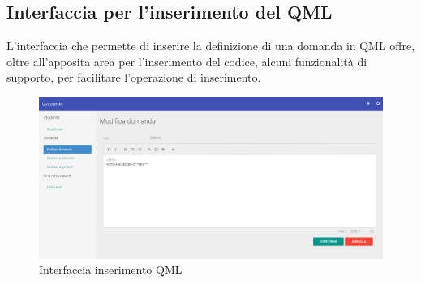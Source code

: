\documentclass[12pt,a4paper]{article}
\begin{document}
	\subsection{Interfaccia per l'inserimento del QML}
	L'interfaccia che permette di inserire la definizione di una domanda in QML offre, oltre all'apposita area per l'inserimento del codice, alcuni funzionalità di supporto, per facilitare l'operazione di inserimento.
	\begin{figure}[H]	
		\centering
		\includegraphics[width=\linewidth]{../img/screenshot/modificaDomanda.png}
		\caption{Interfaccia inserimento QML}
		\label{Interfaccia inserimento QML}
	\end{figure}
		

		
\end{document}
